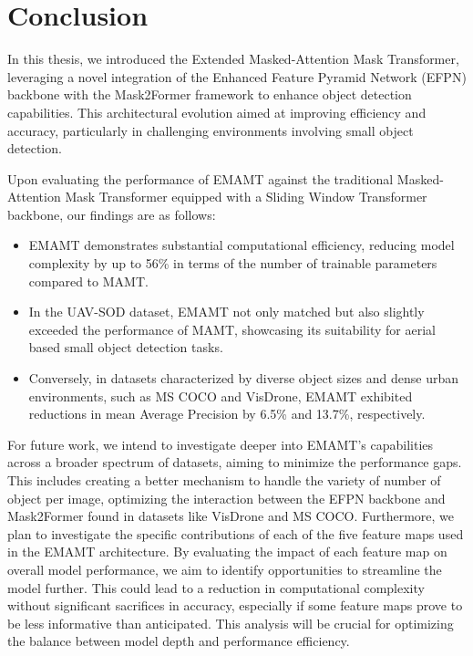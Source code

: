 \chapter{Conclusion}

In this thesis, we introduced the Extended Masked-Attention Mask Transformer, leveraging a novel integration of the 
Enhanced Feature Pyramid Network (EFPN) backbone with the Mask2Former framework to enhance object detection capabilities. 
This architectural evolution aimed at improving efficiency and accuracy, particularly in challenging environments involving small object detection.

Upon evaluating the performance of EMAMT against the traditional Masked-Attention Mask Transformer equipped with a Sliding Window Transformer
backbone, our findings are as follows:

\begin{itemize}
    \item EMAMT demonstrates substantial computational efficiency, reducing model complexity by up to 56\% in terms of the number of trainable parameters compared to MAMT.
    \item In the UAV-SOD dataset, EMAMT not only matched but also slightly exceeded the performance of MAMT, showcasing its suitability for aerial based small object detection tasks.
    \item Conversely, in datasets characterized by diverse object sizes and dense urban environments, such as MS COCO and VisDrone, EMAMT exhibited reductions in mean Average Precision by 6.5\% and 13.7\%, respectively. 
\end{itemize}


For future work, we intend to investigate deeper into EMAMT’s capabilities across a broader spectrum of datasets, aiming to minimize the performance gaps. 
This includes creating a better mechanism to handle the variety of number of object per image, optimizing the interaction between the EFPN backbone and Mask2Former 
found in datasets like VisDrone and MS COCO. Furthermore, we plan to investigate the specific contributions of each of the five feature maps used in the EMAMT architecture. 
By evaluating the impact of each feature map on overall model performance, we aim to identify opportunities to streamline the model further. This could lead to a 
reduction in computational complexity without significant sacrifices in accuracy, especially if some feature maps prove to be less informative than anticipated. 
This analysis will be crucial for optimizing the balance between model depth and performance efficiency.

